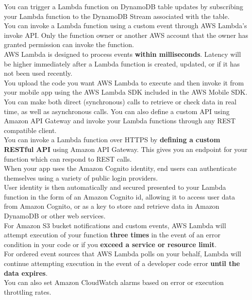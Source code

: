 \documentclass[12pt, letterpaper, twoside]{article}
\begin{document}
You can trigger a Lambda function on DynamoDB table updates by subscribing your Lambda function to the DynamoDB Stream associated 
with the table.\\

You can invoke a Lambda function using a custom event through AWS Lambda’s invoke API. Only the function owner or another AWS account 
that the owner has granted permission can invoke the function.\\

AWS Lambda is designed to process events \textbf{within milliseconds}. Latency will be higher immediately after a Lambda function is 
created, updated, or if it has not been used recently.\\

You upload the code you want AWS Lambda to execute and then invoke it from your mobile app using the AWS Lambda SDK included in the AWS 
Mobile SDK. You can make both direct (synchronous) calls to retrieve or check data in real time, as well as asynchronous calls. 
You can also define a custom API using Amazon API Gateway and invoke your Lambda functions through any REST compatible client.\\

You can invoke a Lambda function over HTTPS by \textbf{defining a custom RESTful API} using Amazon API Gateway. 
This gives you an endpoint for your function which can respond to REST calls.\\

When your app uses the Amazon Cognito identity, end users can authenticate themselves using a variety of public login providers.\\
User identity is then automatically and secured presented to your Lambda function in the form of an Amazon Cognito id, allowing it 
to access user data from Amazon Cognito, or as a key to store and retrieve data in Amazon DynamoDB or other web services.\\

For Amazon S3 bucket notifications and custom events, AWS Lambda will attempt execution of your function \textbf{three times} in 
the event of an error condition in your code or if you \textbf{exceed a service or resource limit}.\\
For ordered event sources that AWS Lambda polls on your behalf, Lambda will continue attempting execution in the event of a 
developer code error \textbf{until the data expires}.\\
You can also set Amazon CloudWatch alarms based on error or execution throttling rates.\\
\end{document}
